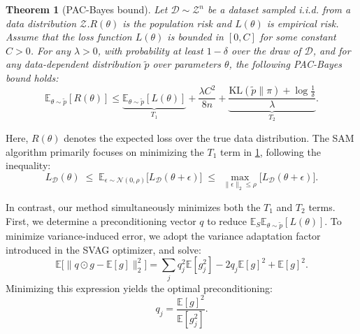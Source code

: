 \documentclass{article}
\theoremstyle{plain}
\newtheorem{theorem}{Theorem}[section]
\theoremstyle{definition}
\theoremstyle{remark}
\begin{document}
\begin{theorem}[PAC-Bayes bound]
  Let \( \mathcal{D} \sim \mathcal{Z}^n \) be a dataset sampled i.i.d. from a data distribution \( \mathcal{Z} \).\(R(\theta)\) is the population risk and \(L(\theta)\) is empirical risk. Assume that the loss function \( L(\theta) \) is bounded in \([0, C]\) for some constant \( C > 0 \).  
For any \( \lambda > 0 \), with probability at least \( 1 - \delta \) over the draw of \( \mathcal{D} \),  
and for any data-dependent distribution \( \tilde{p} \) over parameters \( \theta \), the following PAC-Bayes bound holds:
\[
\mathbb{E}_{\theta \sim \tilde{p}}[R(\theta)]
\le
\underbrace{\mathbb{E}_{\theta \sim \tilde{p}}[L(\theta)]}_{T_1}
+ \frac{\lambda C^2}{8n}
+ \underbrace{\frac{\mathrm{KL}(\tilde{p} \| \pi) + \log \tfrac{1}{\delta}}{\lambda}}_{T_2}.
\]
  \label{thm:pacb}
\end{theorem}

Here, \( R(\theta) \) denotes the expected loss over the true data distribution. The SAM algorithm primarily focuses on minimizing the \( T_1 \) term in \cref{thm:pacb}, following the inequality:
\begin{equation}
  L_{\mathcal{D}}(\theta)
  \;\le\;
  \mathbb{E}_{\epsilon \sim \mathcal{N}(0,\rho)}\bigl[
    L_{\mathcal{D}}(\theta + \epsilon)
  \bigr]
  \;\le\;
  \max_{\|\epsilon\|_2 \le \rho}\bigl[
    L_{\mathcal{D}}(\theta + \epsilon)
  \bigr].
\end{equation}

In contrast, our method simultaneously minimizes both the \( T_1 \) and \( T_2 \) terms.  
First, we determine a preconditioning vector \( q \) to reduce \( \mathbb{E}_S \mathbb{E}_{\theta \sim \tilde{p}}[L(\theta)] \). To minimize variance-induced error, we adopt the variance adaptation factor introduced in the SVAG optimizer\cite{dissecting}, and solve:
\begin{equation}
\mathbb{E}\bigl[\|q \odot g - \mathbb{E}[g]\|_2^2 \bigr]
= \sum_{j} q_j^2 \mathbb{E}[ g_j^2] - 2q_j\mathbb{E}[g]^2 + \mathbb{E}[g]^2.
\label{eq:svag}
\end{equation}
Minimizing this expression yields the optimal preconditioning:
\[
q_j = \frac{\mathbb{E}[g]^2}{\mathbb{E}[g_j^2]}.
\]
\end{document}
